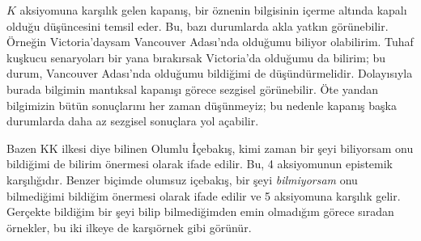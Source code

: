 \documentclass[../../../include/open-logic-section]{subfiles}
\begin{document}
$K$ aksiyomuna karşılık gelen kapanış, bir öznenin bilgisinin içerme altında
kapalı olduğu düşüncesini temsil eder. Bu, bazı durumlarda akla yatkın
görünebilir. Örneğin Victoria'daysam Vancouver Adası'nda olduğumu biliyor
olabilirim. Tuhaf kuşkucu senaryoları bir yana bırakırsak Victoria'da
olduğumu da bilirim; bu durum, Vancouver Adası'nda olduğumu bildiğimi de
düşündürmelidir. Dolayısıyla burada bilgimin mantıksal kapanışı görece
sezgisel görünebilir. Öte yandan bilgimizin bütün sonuçlarını her zaman
düşünmeyiz; bu nedenle kapanış başka durumlarda daha az sezgisel sonuçlara
yol açabilir.

Bazen KK ilkesi diye bilinen Olumlu İçebakış, kimi zaman bir şeyi biliyorsam
onu bildiğimi de bilirim önermesi olarak ifade edilir. Bu, 4 aksiyomunun
epistemik karşılığıdır. Benzer biçimde olumsuz içebakış, bir şeyi
\emph{bilmiyorsam} onu bilmediğimi bildiğim önermesi olarak ifade edilir ve 5
aksiyomuna karşılık gelir. Gerçekte bildiğim bir şeyi bilip bilmediğimden emin
olmadığım görece sıradan örnekler, bu iki ilkeye de karşıörnek gibi görünür.
\end{document}
